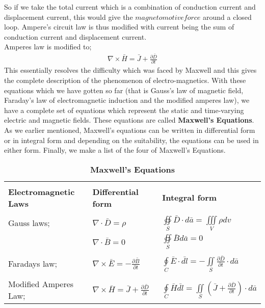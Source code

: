 So if we take the total current which is a combination of conduction current and displacement current, this would give the $magnetomotive force$ around a closed loop.
Ampere's circuit law is thus modified with current being the sum of conduction current and displacement current.\\
Amperes law is modified to;
\begin{align}
\nabla\times\bar{H}=\bar{J}+\frac{\partial\bar{D}}{\partial t}
\end{align}
This essentially resolves the difficulty which was faced by Maxwell and this gives the complete description of the phenomenon of electro-magnetics. With these equations which we have gotten so far (that is Gauss's law of magnetic field, Faraday's law of electromagnetic induction and the modified amperes law), we have a complete set of equations which represent the static and time-varying electric and magnetic fields. These equations are called \textbf{Maxwell's Equations}. As we earlier mentioned, Maxwell's equations can be written in differential form or in integral form and depending on the suitability, the equations can be used in either form. Finally, we make a list of the four of Maxwell's Equations.
\begin{table}[h]
\caption{\textbf{Maxwell's Equations}}
\centering
\begin{tabular}{p{3cm} p{2cm} p{2cm}}
\hline \\
\textbf{Electromagnetic Laws} & \textbf{Differential form} & \textbf{Integral form} \\ [0.5ex]
\hline \\
Gauss laws; & $\nabla\cdot\bar{D}=\rho$ & $\oiint\limits_S\bar{D}\cdot d\bar{a}=\iiint\limits_V
\rho dv$\\
& $\nabla\cdot\bar{B}=0$ & $\oiint\limits_S\bar{B}d\bar{a}=0$\\
\hline \\

Faradays law; & $\nabla\times\bar{E}=-\frac{\partial\bar{B}}{\partial t}$ & $\oint\limits_C\bar{E}\cdot\bar{dl}=-\iint\limits_S\frac{\partial\bar{D}}{\partial t}\cdot d\bar{a}$ \\
\hline \\
Modified Amperes Law; &
$\nabla\times\bar{H}=\bar{J}+\frac{\partial\bar{D}}{\partial t}$ & $\oint\limits_C\bar{H}\bar{dl}=\iint\limits_S(\bar{J}+\frac{\partial\bar{D}}{\partial t})\cdot d\bar{a}$ \\
\hline
\end{tabular}
\end{table}

